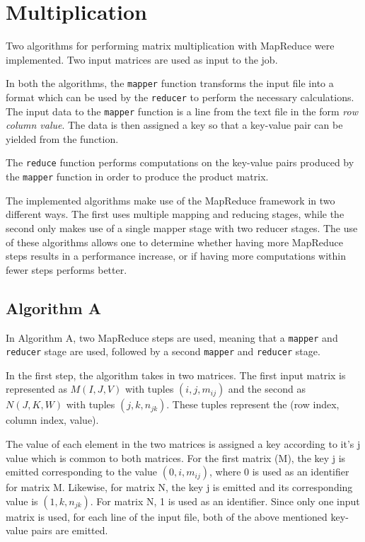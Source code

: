 \documentclass[10pt,twocolumn]{witseiepaper}
\begin{document}
\section{Multiplication}
Two algorithms for performing matrix multiplication with MapReduce were implemented. Two input matrices are used as input to the job.

In both the algorithms, the \texttt{mapper} function transforms the input file into a format which can be used by the \texttt{reducer} to perform the necessary calculations. The input data to the \texttt{mapper} function is a line from the text file in the form \textit{row column value}. The data is then assigned a key so that a key-value pair can be yielded from the function.

The \texttt{reduce} function performs computations on the key-value pairs produced by the \texttt{mapper} function in order to produce the product matrix.

The implemented algorithms make use of the MapReduce framework in two different ways. The first uses multiple mapping and reducing stages, while the second only makes use of a single mapper stage with two reducer stages. The use of these algorithms allows one to determine whether having more MapReduce steps results in a performance increase, or if having more computations within fewer steps performs better.

\subsection{Algorithm A} \label{algA}
In Algorithm A, two MapReduce steps are used, meaning that a \texttt{mapper} and \texttt{reducer} stage are used, followed by a second \texttt{mapper} and \texttt{reducer} stage.

In the first step, the algorithm takes in two matrices. The first input matrix is represented as $M(I, J, V)$ with tuples $(i, j, m_{ij})$ and the second as $N(J, K, W)$ with tuples $(j, k, n_{jk})$. These tuples represent the (row index, column index, value).

The value of each element in the two matrices is assigned a key according to it's j value which is common to both matrices. For the first matrix (M), the key j is emitted corresponding to the value $(0, i, m_{ij})$, where 0 is used as an identifier for matrix M. Likewise, for matrix N, the key j is emitted and its corresponding value is $(1, k, n_{jk})$. For matrix N, 1 is used as an identifier. Since only one input matrix is used, for each line of the input file, both of the above mentioned key-value pairs are emitted.
\end{document}
